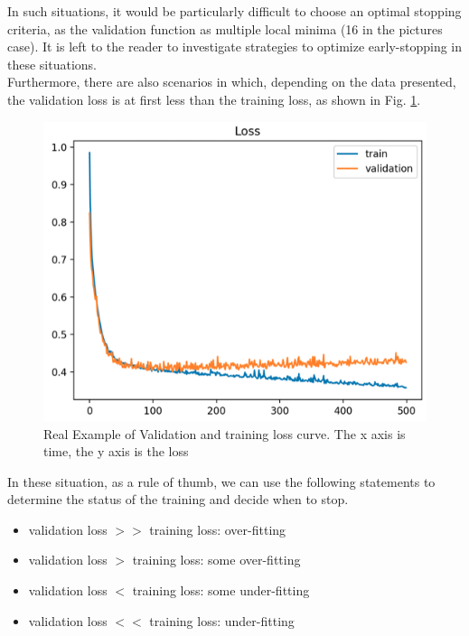 In such situations, it would be particularly difficult to choose an optimal stopping criteria, as the validation function as multiple local minima (16 in the pictures case). It is left to the reader to investigate strategies to optimize early-stopping in these situations. \\
Furthermore, there are also scenarios in which, depending on the data presented, the validation loss is at first less than the training loss, as shown in Fig. \ref{fig:over_fitting_curve_2}. 
\begin{figure}[htb]
    \centering
    \includegraphics[scale = 0.4]{img/over_fitting_2.png}
    \caption[Real Example of the Validation and training loss curve]{Real Example of Validation and training loss curve. The x axis is time, the y axis is the loss}
    \label{fig:over_fitting_curve_2}
\end{figure}

In these situation, as a rule of thumb, we can use the following statements to determine the status of the training and decide when to stop. 
\begin{itemize}
\item validation loss $>>$ training loss: over-fitting
\item validation loss $>$ training loss: some over-fitting
\item validation loss $<$ training loss: some under-fitting
\item validation loss $<<$ training loss: under-fitting

\end{itemize}


